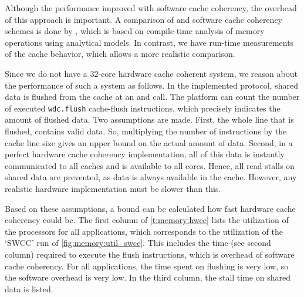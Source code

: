 Although the performance improved with software cache coherency, the overhead of this approach is important.
A comparison of  and software cache coherency schemes is done by \citet{adve:hwsw_cache_coherency}, which is based on compile-time analysis of memory operations using analytical models.
In contrast, we have run-time measurements of the cache behavior, which allows a more realistic comparison.

Since we do not have a 32-core hardware cache coherent \MicroBlaze system, we reason about the performance of such a system as follows.
In the implemented protocol, shared data is flushed from the cache at an  and  call.
The platform can count the number of executed \lstinline{wdc.flush} \MicroBlaze cache-flush instructions, which precisely indicates the amount of flushed data.
Two assumptions are made.
First, the whole line that is flushed, contains valid data.
So, multiplying the number of instructions by the cache line size gives an upper bound on the actual amount of data.
Second, in a perfect hardware cache coherency implementation, all of this data is instantly communicated to all caches and is available to all cores.
Hence, all read stalls on shared data are prevented, as data is always available in the cache.
However, any realistic hardware implementation must be slower than this.

Based on these assumptions, a bound can be calculated how fast hardware cache coherency could be.
The first column of \vref{t:memory:hwcc} lists the utilization of the processors for all applications, which corresponds to the utilization of the `\acs{SWCC}' run of \cref{fig:memory:util_swcc}.
This includes the time (see second column) required to execute the flush instructions, which is overhead of software cache coherency.
For all applications, the time spent on flushing is very low, so the software overhead is very low.
In the third column, the stall time on shared data is listed.


